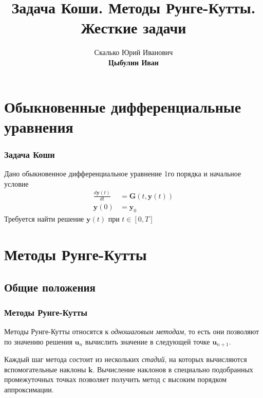 \documentclass[professionalfonts,compress,unicode,aspectratio=169]{beamer}
\title[Методы Рунге-Кутты]{Задача Коши. Методы Рунге-Кутты. Жесткие задачи}
\author[Цыбулин И.В.]{Скалько Юрий Иванович\\
\textbf{Цыбулин Иван}}
\date{}
\begin{document}
\begin{frame}[plain]
\titlepage
\end{frame}

\renewcommand{\L}{\mathcal{L}}
\renewcommand{\vec}[1]{\boldsymbol{\mathbf{#1}}}
\newcommand{\pd}[2]{\frac{\partial #1}{\partial #2}}
\newcommand{\tr}{\mathsf{T}}

\section{Обыкновенные дифференциальные уравнения}
\begin{frame}\frametitle{Задача Коши}
	Дано обыкновенное дифференциальное уравнение 1го порядка и начальное условие
	\begin{align*}
	\frac{d\vec y(t)}{dt} &= \vec G(t, \vec y(t))\\
	\vec y(0) &= \vec y_0
	\end{align*}
	Требуется найти решение $\vec y(t)$ при $t \in [0, T]$
\end{frame}

\section{Методы Рунге-Кутты}
\subsection{Общие положения}
\begin{frame}\frametitle{Методы Рунге-Кутты}
	Методы Рунге-Кутты относятся к \emph{одношаговым методам}, то есть они позволяют по
	значению решения $\vec u_{n}$ вычислить значение в следующей точке $\vec u_{n+1}$.

	Каждый шаг метода состоит из нескольких \emph{стадий}, на которых вычисляются вспомогательные
	наклоны $\vec k$. Вычисление наклонов в специально подобранных промежуточных точках позволяет
	получить метод с высоким порядком аппроксимации.
\end{frame}
\end{document}
